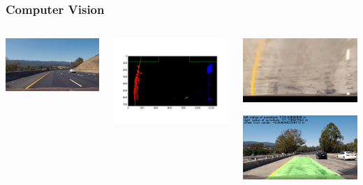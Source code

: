\documentclass[mathserif]{beamer}
\begin{document}
\begin{frame}
\frametitle{Computer Vision}

\begin{columns}[c]
\column{1.5in}
\includegraphics[width=45mm]{alf1.jpg}

\includegraphics[width=5.5cm]{alf3.png}

\column{3in}
\begin{center}
\includegraphics[width=5.5cm]{alf2.jpg}

\includegraphics[width=5.5cm]{alf4.jpg}

\vspace{0.1cm}
\begin{columns}[c]
\column{1.5in}

\end{columns}
\end{center}
\end{columns}

\end{frame}
\end{document}
